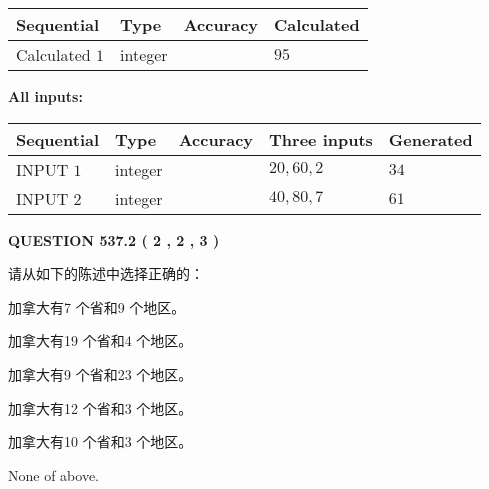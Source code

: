 \documentclass{ctexart}
\begin{document}
   
   
   
\noindent{}
   
   
  
  
\noindent\begin{tabular}{|l|l|l|l|}
\hline
 Sequential & Type & Accuracy & Calculated \\ 
\hline
 
 
  Calculated $  1 $ & integer &  & 
  $ 95 $ 
 \\  \hline  
 \end{tabular}
   
   
   
   
\noindent\vspace{0.1in}\hspace{-0.08in} {\textbf{\Large{All inputs: }}}
   
   
  
  
\noindent\begin{tabular}{|l|l|l|l|l|}
\hline
 Sequential & Type & Accuracy & Three inputs & Generated \\ 
\hline
 
 
  INPUT $  1 $ & integer &  & $
 20
 , 
 60
 , 
 2
 $ & $ 34 $ 
 \\  \hline  
 
 
  INPUT $  2 $ & integer &  & $
 40
 , 
 80
 , 
 7
 $ & $ 61 $ 
 \\  \hline  
 \end{tabular}
   
   
  
\vspace{0.2in}
  
{\textbf{\Large{QUESTION
537.2 
 ( 2 , 2 , 3 )
}}}
  
  
请从如下的陈述中选择正确的：
 
 
加拿大有7 个省和9 个地区。
 
 
加拿大有19 个省和4 个地区。
 
 
加拿大有9 个省和23 个地区。
 
 
加拿大有12 个省和3 个地区。
 
 
加拿大有10 个省和3 个地区。
 
 
 None of above.
 
 
\noindent{}
 
\end{document}
